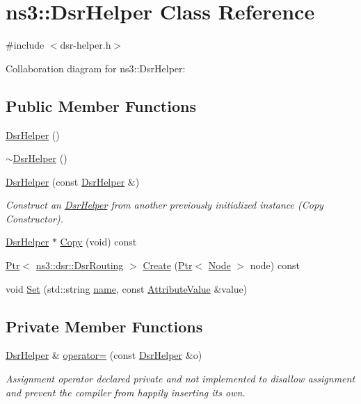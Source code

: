 \hypertarget{classns3_1_1DsrHelper}{}\section{ns3\+:\+:Dsr\+Helper Class Reference}
\label{classns3_1_1DsrHelper}


{\ttfamily \#include $<$dsr-\/helper.\+h$>$}



Collaboration diagram for ns3\+:\+:Dsr\+Helper\+:
\subsection*{Public Member Functions}
\begin{DoxyCompactItemize}
\item 
\hyperlink{classns3_1_1DsrHelper_ade30f2c4532d210c5641b59ed1aea761}{Dsr\+Helper} ()
\item 
\hyperlink{classns3_1_1DsrHelper_a3a0fcd9e1a98e2a3be10c6ac7329452c}{$\sim$\+Dsr\+Helper} ()
\item 
\hyperlink{classns3_1_1DsrHelper_ab7bcd467cfcea41e6f9778127633852e}{Dsr\+Helper} (const \hyperlink{classns3_1_1DsrHelper}{Dsr\+Helper} \&)
\begin{DoxyCompactList}\small\item\em Construct an \hyperlink{classns3_1_1DsrHelper}{Dsr\+Helper} from another previously initialized instance (Copy Constructor). \end{DoxyCompactList}\item 
\hyperlink{classns3_1_1DsrHelper}{Dsr\+Helper} $\ast$ \hyperlink{classns3_1_1DsrHelper_aa40c5a33ca2a290ad3965827b52add73}{Copy} (void) const 
\item 
\hyperlink{classns3_1_1Ptr}{Ptr}$<$ \hyperlink{classns3_1_1dsr_1_1DsrRouting}{ns3\+::dsr\+::\+Dsr\+Routing} $>$ \hyperlink{classns3_1_1DsrHelper_ad855c0aae21f5a7d6cc5ed6d31ac5034}{Create} (\hyperlink{classns3_1_1Ptr}{Ptr}$<$ \hyperlink{classns3_1_1Node}{Node} $>$ node) const 
\item 
void \hyperlink{classns3_1_1DsrHelper_afa9d0f2674a1a8b88d0c83225a87d11a}{Set} (std\+::string \hyperlink{generate__test__data__lte__spectrum__model_8m_ab74e6bf80237ddc4109968cedc58c151}{name}, const \hyperlink{classns3_1_1AttributeValue}{Attribute\+Value} \&value)
\end{DoxyCompactItemize}
\subsection*{Private Member Functions}
\begin{DoxyCompactItemize}
\item 
\hyperlink{classns3_1_1DsrHelper}{Dsr\+Helper} \& \hyperlink{classns3_1_1DsrHelper_a89ee26ec3a50b1b4320ca833fe04c72f}{operator=} (const \hyperlink{classns3_1_1DsrHelper}{Dsr\+Helper} \&o)
\begin{DoxyCompactList}\small\item\em Assignment operator declared private and not implemented to disallow assignment and prevent the compiler from happily inserting its own. \end{DoxyCompactList}\end{DoxyCompactItemize}

